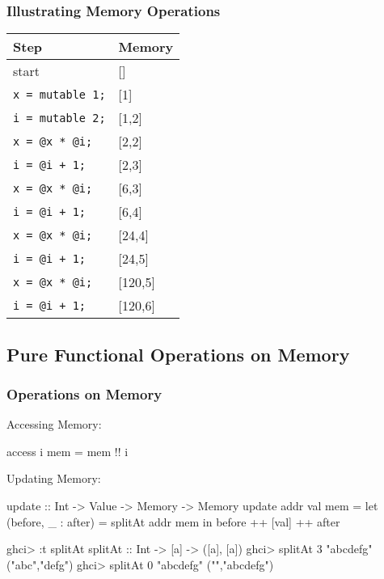 \documentclass[xcolor=pdftex,dvipsnames,table]{beamer}
\begin{document}
\begin{frame}[fragile]
\frametitle{Illustrating Memory Operations}

\begin{tabular}{l|l}
Step&	Memory\\
\hline\hline
start&	[]
\\\pause
\verb+x = mutable 1;+	& [1] \pause
\\
\verb+i = mutable 2;+&	[1,2]\pause
\\
\verb+x = @x * @i;+	&[2,2]\pause
\\
\verb|i = @i + 1;|	& [2,3]\pause
\\
\verb+x = @x * @i;+&	[6,3]
\\
\verb|i = @i + 1;|&	[6,4]
\\
\verb+x = @x * @i;+&	[24,4]
\\
\verb|i = @i + 1;|	&[24,5]
\\
\verb+x = @x * @i;+&	[120,5]
\\
\verb|i = @i + 1;|	&[120,6]
\end{tabular}

\end{frame}

\subsection{Pure Functional Operations on Memory}
\begin{frame}[fragile]
\frametitle{Operations on Memory}

\noindent Accessing Memory:
\begin{hcode}
access i mem = mem !! i
\end{hcode}

\vfill\pause

\noindent Updating Memory:
\begin{hcode}
update :: Int -> Value -> Memory -> Memory
update addr val mem =
  let (before, _ : after) = splitAt addr mem in
    before ++ [val] ++ after
\end{hcode}
\vfill

\pause
\begin{hcode}
ghci> :t splitAt
   splitAt :: Int -> [a] -> ([a], [a])
ghci> splitAt 3 "abcdefg"
   ("abc","defg")
ghci> splitAt 0 "abcdefg"
   ("","abcdefg")
\end{hcode}

\end{frame}
\end{document}

